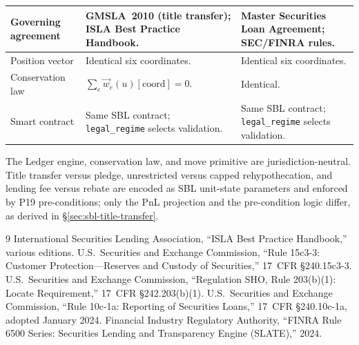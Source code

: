 \documentclass[11pt,a4paper]{article}
\begin{document}
\begin{center}
\begin{longtable}{p{3.2cm} p{5.2cm} p{5.2cm}}
\midrule
Governing agreement & GMSLA~2010 (title transfer); ISLA Best Practice Handbook. & Master Securities Loan Agreement; SEC/FINRA rules. \\
\midrule
Position vector & Identical six coordinates. & Identical six coordinates. \\
\midrule
Conservation law & $\sum_e \vec{w}_e(u)[\text{coord}] = 0$. & Identical. \\
\midrule
Smart contract & Same SBL contract; \texttt{legal\_regime} selects validation. & Same SBL contract; \texttt{legal\_regime} selects validation. \\
\bottomrule
\end{longtable}
\end{center}

\noindent The Ledger engine, conservation law, and move primitive are jurisdiction-neutral. Title transfer versus pledge, unrestricted versus capped rehypothecation, and lending fee versus rebate are encoded as SBL unit-state parameters and enforced by P19 pre-conditions; only the PnL projection and the pre-condition logic differ, as derived in \S\ref{sec:sbl-title-transfer}.


\begin{thebibliography}{9}
 International Securities Lending Association, ``ISLA Best Practice Handbook,'' various editions.
 U.S.\ Securities and Exchange Commission, ``Rule 15c3-3: Customer Protection---Reserves and Custody of Securities,'' 17~CFR \S240.15c3-3.
 U.S.\ Securities and Exchange Commission, ``Regulation SHO, Rule 203(b)(1): Locate Requirement,'' 17~CFR \S242.203(b)(1).
 U.S.\ Securities and Exchange Commission, ``Rule 10c-1a: Reporting of Securities Loans,'' 17~CFR \S240.10c-1a, adopted January 2024.
 Financial Industry Regulatory Authority, ``FINRA Rule 6500 Series: Securities Lending and Transparency Engine (SLATE),'' 2024.
\end{thebibliography}
\end{document}
